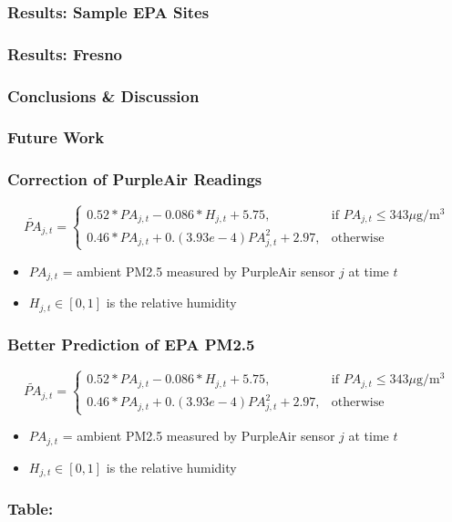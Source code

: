 \documentclass{beamer}
\begin{document}
\begin{frame}
\frametitle{Results: Sample EPA Sites}
\end{frame}


\begin{frame}
\frametitle{Results: Fresno}
\end{frame}


\begin{frame}
\frametitle{Conclusions \& Discussion}
\end{frame}


\begin{frame}
\frametitle{Future Work}
\end{frame}


\begin{frame}
\frametitle{Correction of PurpleAir Readings}
$$
\widetilde{PA}_{j,t}=\begin{cases}
			0.52*PA_{j,t} - 0.086*H_{j,t} + 5.75, & \text{if $PA_{j,t} \leq 343 \mu$g/m$^3$}\\
            0.46*PA_{j,t} + 0.(3.93e-4)PA_{j,t}^2 + 2.97, & \text{otherwise}
		 \end{cases}
$$
\begin{itemize}
    \item $PA_{j,t}$ = ambient PM2.5 measured by PurpleAir sensor $j$ at time $t$
    \item $H_{j,t}\in[0,1]$ is the relative humidity
\end{itemize}
\end{frame}


\begin{frame}
\frametitle{Better Prediction of EPA PM2.5}

$$
\widetilde{PA}_{j,t}=\begin{cases}
			0.52*PA_{j,t} - 0.086*H_{j,t} + 5.75, & \text{if $PA_{j,t} \leq 343 \mu$g/m$^3$}\\
            0.46*PA_{j,t} + 0.(3.93e-4)PA_{j,t}^2 + 2.97, & \text{otherwise}
		 \end{cases}
$$
\begin{itemize}
    \item $PA_{j,t}$ = ambient PM2.5 measured by PurpleAir sensor $j$ at time $t$
    \item $H_{j,t}\in[0,1]$ is the relative humidity
\end{itemize}
\end{frame}


\begin{frame}
\frametitle{Table: }
\end{frame}
\end{document}
